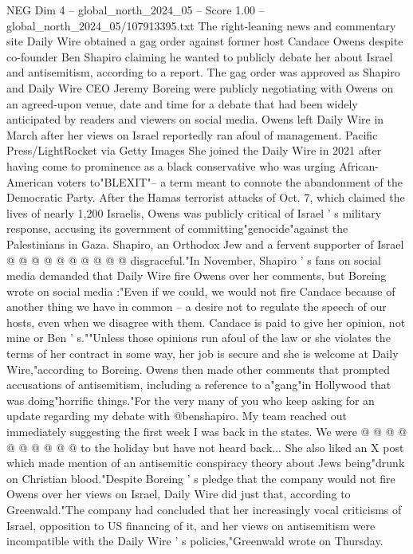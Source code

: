 \begin{textsample}{NEG Dim 4 – global\_north\_2024\_05 – Score 1.00 – global\_north\_2024\_05/107913395.txt}  \label{ex:f4_neg_125}
The right-leaning news and commentary site Daily Wire obtained a gag order against former host Candace Owens despite co-founder Ben Shapiro claiming he wanted to publicly debate her about Israel and antisemitism, according to a report.
The gag order was approved as Shapiro and Daily Wire CEO Jeremy Boreing were publicly negotiating with Owens on an agreed-upon venue, date and time for a debate that had been widely anticipated by readers and viewers on social media.
Owens left Daily Wire in March after her views on Israel reportedly ran afoul of management.
Pacific Press/LightRocket via Getty Images She joined the Daily Wire in 2021 after having come to prominence as a black conservative who was urging African-American voters to"BLEXIT"-- a term meant to connote the abandonment of the Democratic Party.
After the Hamas terrorist attacks of Oct. 7, which claimed the lives of nearly 1,200 Israelis, Owens was publicly critical of Israel ' s military response, accusing its government of committing"genocide"against the Palestinians in Gaza.
Shapiro, an Orthodox Jew and a fervent supporter of Israel @ @ @ @ @ @ @ @ @ @ disgraceful."In November, Shapiro ' s fans on social media demanded that Daily Wire fire Owens over her comments, but Boreing wrote on social media :"Even if we could, we would not fire Candace because of another thing we have in common -- a desire not to regulate the speech of our hosts, even when we disagree with them.
Candace is paid to give her opinion, not mine or Ben ' s.""Unless those opinions run afoul of the law or she violates the terms of her contract in some way, her job is secure and she is welcome at Daily Wire,"according to Boreing.
Owens then made other comments that prompted accusations of antisemitism, including a reference to a"gang"in Hollywood that was doing"horrific things."For the very many of you who keep asking for an update regarding my debate with @benshapiro.
My team reached out immediately suggesting the first week I was back in the states.
We were @ @ @ @ @ @ @ @ @ @ to the holiday but have not heard back...
She also liked an X post which made mention of an antisemitic conspiracy theory about Jews being"drunk on Christian blood."Despite Boreing ' s pledge that the company would not fire Owens over her views on Israel, Daily Wire did just that, according to Greenwald."The company had concluded that her increasingly vocal criticisms of Israel, opposition to US financing of it, and her views on antisemitism were incompatible with the Daily Wire ' s policies,"Greenwald wrote on Thursday.

\end{textsample}
